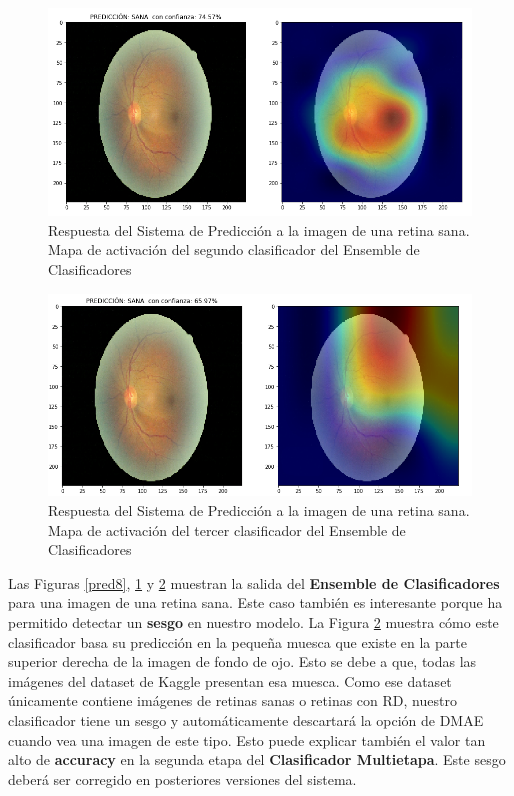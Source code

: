 \documentclass[
  12pt,
  spanish,
  a4paperpaper,
]{report}
\begin{document}
\begin{figure}
\centering
\includegraphics[width=1\textwidth,height=\textheight]{source/figures/pred9.png}
\caption{Respuesta del Sistema de Predicción a la imagen de una retina
sana. Mapa de activación del segundo clasificador del Ensemble de
Clasificadores \label{pred9}}
\end{figure}

\begin{figure}
\centering
\includegraphics[width=1\textwidth,height=\textheight]{source/figures/pred10.png}
\caption{Respuesta del Sistema de Predicción a la imagen de una retina
sana. Mapa de activación del tercer clasificador del Ensemble de
Clasificadores \label{pred10}}
\end{figure}

Las Figuras \ref{pred8}, \ref{pred9} y \ref{pred10} muestran la salida
del \textbf{Ensemble de Clasificadores} para una imagen de una retina
sana. Este caso también es interesante porque ha permitido detectar un
\textbf{sesgo} en nuestro modelo. La Figura \ref{pred10} muestra cómo
este clasificador basa su predicción en la pequeña muesca que existe en
la parte superior derecha de la imagen de fondo de ojo. Esto se debe a
que, todas las imágenes del dataset de Kaggle presentan esa muesca. Como
ese dataset únicamente contiene imágenes de retinas sanas o retinas con
RD, nuestro clasificador tiene un sesgo y automáticamente descartará la
opción de DMAE cuando vea una imagen de este tipo. Esto puede explicar
también el valor tan alto de \textbf{accuracy} en la segunda etapa del
\textbf{Clasificador Multietapa}. Este sesgo deberá ser corregido en
posteriores versiones del sistema.
\end{document}
